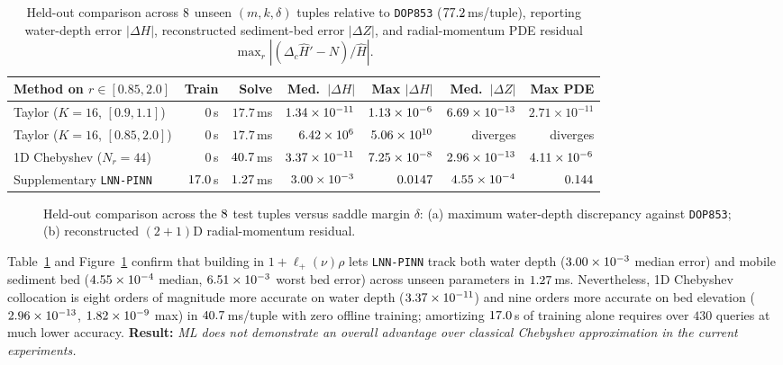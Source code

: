 \documentclass[12pt,a4paper,oneside]{report}
\numberwithin{equation}{chapter}
\theoremstyle{definition}
\theoremstyle{remark}\newtheorem{remark}[theorem]{Remark}
\DeclareRobustCommand{\code}[1]{\nolinkurl{#1}}
\begin{document}
\begin{table}[!ht]\centering\small
\setlength{\tabcolsep}{1.0mm}
\begin{tabularx}{\linewidth}{@{}Xrrrrrr@{}}
\toprule
Method on $r\in[0.85,2.0]$ & Train & Solve & Med.\ $|\Delta H|$ & Max $|\Delta H|$ & Med.\ $|\Delta Z|$ & Max PDE\\\midrule
Taylor ($K=16$, $[0.9,1.1]$) & $0$\,s & $17.7$\,ms & $1.34\times 10^{-11}$ & $1.13\times 10^{-6}$ & $6.69\times 10^{-13}$ & $2.71\times10^{-11}$\\
Taylor ($K=16$, $[0.85,2.0]$) & $0$\,s & $17.7$\,ms & $6.42\times 10^{6}$ & $5.06\times 10^{10}$ & diverges & diverges\\
1D Chebyshev ($N_r=44$) & $0$\,s & $40.7$\,ms & $3.37\times 10^{-11}$ & $7.25\times 10^{-8}$ & $2.96\times 10^{-13}$ & $4.11\times 10^{-6}$\\
Supplementary \texttt{LNN-PINN} & $17.0$\,s & $1.27$\,ms & $3.00\times 10^{-3}$ & $0.0147$ & $4.55\times 10^{-4}$ & $0.144$\\\bottomrule
\end{tabularx}
\caption[Held-out water-depth and sediment-bed comparison]{Held-out comparison across $8$ unseen $(m,k,\delta)$ tuples relative to \code{DOP853} ($77.2$\,ms/tuple), reporting water-depth error $|\Delta H|$, reconstructed sediment-bed error $|\Delta Z|$, and radial-momentum PDE residual $\max_r|(\Delta_c\widehat H'-N)/\widehat H|$.}
\label{tab:param-results}
\vspace{-2.5mm}
\end{table}

\begin{figure}[!ht]\centering
\vspace{-1.5mm}

\vspace{-2mm}
\caption[Held-out depth errors and parent-PDE residuals]{Held-out comparison across the $8$ test tuples versus saddle margin $\delta$: (a) maximum water-depth discrepancy against \code{DOP853}; (b) reconstructed $(2+1)$D radial-momentum residual.}
\label{fig:annulus-errors}
\end{figure}

Table~\ref{tab:param-results} and Figure~\ref{fig:annulus-errors} confirm that building in $1+\ell_+(\nu)\rho$ lets \texttt{LNN-PINN} track both water depth ($3.00\times 10^{-3}$ median error) and mobile sediment bed ($4.55\times 10^{-4}$ median, $6.51\times 10^{-3}$ worst bed error) across unseen parameters in $1.27$\,ms. Nevertheless, 1D Chebyshev collocation is eight orders of magnitude more accurate on water depth ($3.37\times 10^{-11}$) and nine orders more accurate on bed elevation ($2.96\times 10^{-13}$, $1.82\times 10^{-9}$ max) in $40.7$\,ms/tuple with zero offline training; amortizing $17.0$\,s of training alone requires over $430$ queries at much lower accuracy. \textbf{Result:} \emph{ML does not demonstrate an overall advantage over classical Chebyshev approximation in the current experiments.}
\FloatBarrier
\end{document}
